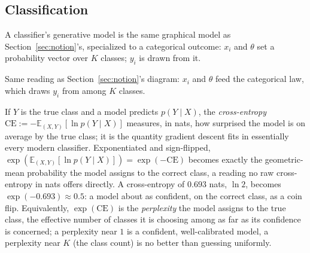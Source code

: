 \documentclass[11pt]{article}
\begin{document}
\subsection{Classification}
\label{sec:classification}

A classifier's generative model is the same graphical model as
Section~\ref{sec:notion}'s, specialized to a categorical outcome: $x_i$
and $\theta$ set a probability vector over $K$ classes; $y_i$ is
drawn from it.

\begin{center}
\end{center}
\begin{center}
\footnotesize
Same reading as Section~\ref{sec:notion}'s diagram: $x_i$ and $\theta$
feed the categorical law, which draws $y_i$ from among $K$ classes.
\end{center}

If $Y$ is the true class and a model predicts $p(Y \mid X)$, the
\emph{cross-entropy} $\mathrm{CE} := -\mathbb E_{(X,Y)}[\ln p(Y \mid
X)]$ measures, in nats, how surprised the model is on average by the
true class; it is the quantity gradient descent fits in essentially
every modern classifier. Exponentiated and sign-flipped, $\exp(\mathbb
E_{(X,Y)}[\ln p(Y \mid X)]) = \exp(-\mathrm{CE})$ becomes exactly the
geometric-mean probability the model assigns to the correct class, a
reading no raw cross-entropy in nats offers directly. A cross-entropy
of $0.693$ nats, $\ln 2$, becomes $\exp(-0.693) \approx 0.5$: a model
about as confident, on the correct class, as a coin flip. Equivalently,
$\exp(\mathrm{CE})$ is the \emph{perplexity} the model assigns to the
true class, the effective number of classes it is choosing among as
far as its confidence is concerned; a perplexity near $1$ is a
confident, well-calibrated model, a perplexity near $K$ (the class
count) is no better than guessing uniformly.
\end{document}
